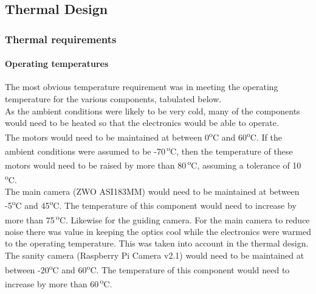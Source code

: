 \pagebreak
\subsection{Thermal Design} 
\label{Thermal_section}















\subsubsection{Thermal requirements}

\paragraph{Operating temperatures}

The most obvious temperature requirement was in meeting the operating temperature for the various components, tabulated below.\\ 



As the ambient conditions were likely to be very cold, many of the components would need to be heated so that the electronics would be able to operate.\\

The motors would need to be maintained at between 0\textsuperscript{o}C and 60\textsuperscript{o}C. If the ambient conditions were assumed to be -70\,\textsuperscript{o}C, then the temperature of these motors would need to be raised by more than 80\,\textsuperscript{o}C, assuming a tolerance of 10\,\textsuperscript{o}C.\\

The main camera (ZWO ASI183MM) would need to be maintained at between -5\textsuperscript{o}C and 45\textsuperscript{o}C. The temperature of this component would need to increase by more than 75\,\textsuperscript{o}C. Likewise for the guiding camera. For the main camera to reduce noise there was value in keeping the optics cool while the electronics were warmed to the operating temperature. This was taken into account in the thermal design.\\

The sanity camera (Raspberry Pi Camera v2.1) would need to be maintained at between -20\textsuperscript{o}C and 60\textsuperscript{o}C. The temperature of this component would need to increase by more than 60\,\textsuperscript{o}C.\\


